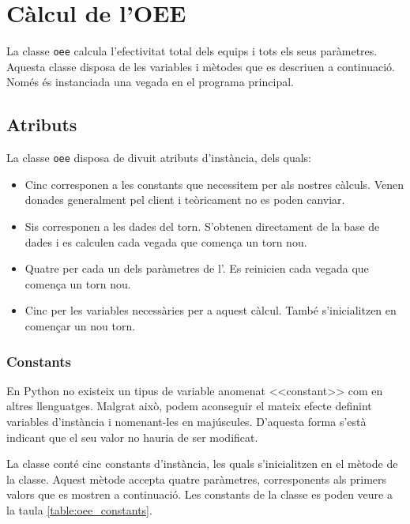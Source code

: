 \documentclass{tfgitic}[2022/06/30]
\begin{document}
\chapter{Càlcul de l'OEE}
\label{chapter:oee}
La classe \texttt{oee} calcula l'efectivitat total dels equips i tots els seus paràmetres. Aquesta classe disposa de les variables i mètodes que es descriuen a continuació. Només és instanciada una vegada en el programa principal.

\section{Atributs}
La classe \texttt{oee} disposa de divuit atributs d'instància, dels quals:

\begin{itemize}
    \item Cinc corresponen a les constants que necessitem per als nostres càlculs. Venen donades generalment pel client i teòricament no es poden canviar.
    \item Sis corresponen a les dades del torn. S'obtenen directament de la base de dades i es calculen cada vegada que comença un torn nou.
    \item Quatre per cada un dels paràmetres de l'. Es reinicien cada vegada que comença un torn nou.
    \item Cinc per les variables necessàries per a aquest càlcul. També s'inicialitzen en començar un nou torn.
\end{itemize}

\subsection{Constants}
En Python no existeix un tipus de variable anomenat <<constant>> com en altres llenguatges. Malgrat això, podem aconseguir el mateix efecte definint variables d'instància i nomenant-les en majúscules. D'aquesta forma s'està indicant que el seu valor no hauria de ser modificat.

La classe  conté cinc constants d'instància, les quals s'inicialitzen en el mètode  de la classe. Aquest mètode accepta quatre paràmetres, corresponents als primers valors que es mostren a continuació. Les constants de la classe  es poden veure a la taula \ref{table:oee_constants}.
\end{document}
